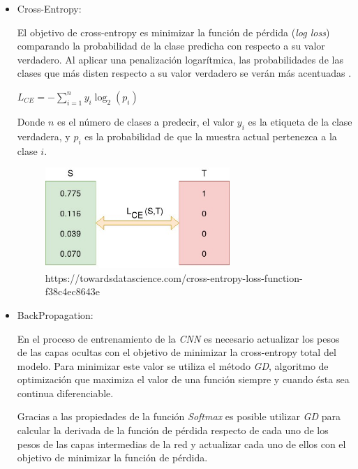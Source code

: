 \begin{itemize}
                \item Cross-Entropy:

                    El objetivo de cross-entropy es minimizar la función de pérdida (\textit{log loss}) comparando la probabilidad de la clase predicha con respecto a su valor verdadero. Al aplicar una penalización logarítmica, las probabilidades de las clases que más disten respecto a su valor verdadero se verán más acentuadas \cite{Cross-Entropy}.

                    \begin{center}
                        $L_{CE} = -\sum_{i = 1}^n y_i \log_2(p_i)$
                    \end{center}

                    Donde $n$ es el número de clases a predecir, el valor $y_i$ es la etiqueta de la clase verdadera, y $p_i$ es la probabilidad de que la muestra actual pertenezca a la clase $i$.

                    \begin{figure}[h]
                        \centering
                        \includegraphics[width=7cm]{archivos/CNN/CrossEntropy}
                        \caption{https://towardsdatascience.com/cross-entropy-loss-function-f38c4ec8643e}
                        \label{CrossEntropyImage}
                     \end{figure}

                \item BackPropagation:

                    En el proceso de entrenamiento de la \textit{CNN} es necesario actualizar los pesos de las capas ocultas con el objetivo de minimizar la cross-entropy total del modelo. Para minimizar este valor se utiliza el método \textit{GD}, algoritmo de optimización que maximiza el valor de una función siempre y cuando ésta sea continua diferenciable.

                    Gracias a las propiedades de la función \textit{Softmax} es posible utilizar \textit{GD} para calcular la derivada de la función de pérdida respecto de cada uno de los pesos de las capas intermedias de la red y actualizar cada uno de ellos con el objetivo de minimizar la función de pérdida.


\end{itemize}
